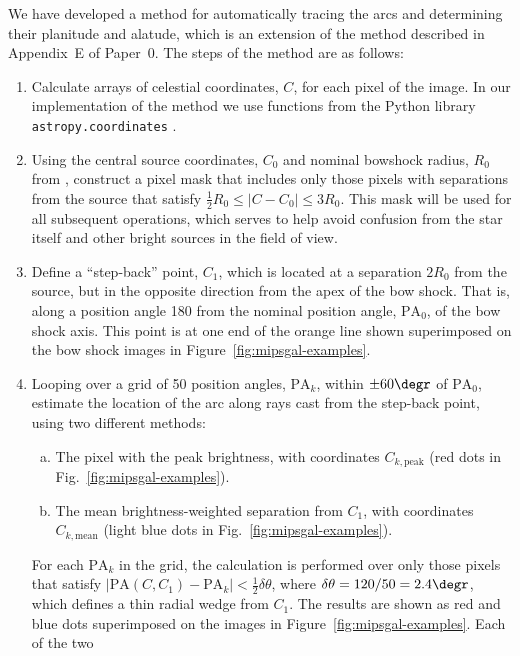 \documentclass[useAMS, usenatbib, a4paper]{mnras}
\begin{document}
We have developed a method for automatically tracing the arcs and
determining their planitude and alatude, which is an extension of the
method described in Appendix~E of Paper~0.  The steps of the method
are as follows:
\begin{enumerate}[1.]
\item Calculate arrays of celestial coordinates, \(C\), for each pixel
  of the image. In our implementation of the method we use functions
  from the Python library \texttt{astropy.coordinates}
  \citep{Astropy-Collaboration:2018a}.
\item Using the central source coordinates, \(C_0\) and nominal
  bowshock radius, \(R_0\) from \citet{Kobulnicky:2016a}, construct a
  pixel mask that includes only those pixels with separations from the
  source that satisfy \(\frac12 R_0 \le |C - C_0| \le 3 R_0\).  This mask
  will be used for all subsequent operations, which serves to help
  avoid confusion from the star itself and other bright sources in the
  field of view.
\item Define a ``step-back'' point, \(C_1\), which is located at a
  separation \(2 R_0\) from the source, but in the opposite direction
  from the apex of the bow shock. That is, along a position angle
  180\degr{} from the nominal position angle, \(\text{PA}_0\), of the
  bow shock axis.  This point is at one end of the orange line shown
  superimposed on the bow shock images in
  Figure~\ref{fig:mipsgal-examples}.
\item Looping over a grid of 50 position angles, \(\text{PA}_k\),
  within \(\pm 60\degr\) of \(\text{PA}_0\), estimate the location of
  the arc along rays cast from the step-back point, using two
  different methods:
  \begin{enumerate}[(a)]
  \item The pixel with the peak brightness, with coordinates
    \(C_{k,\text{peak}}\) (red dots in
    Fig.~\ref{fig:mipsgal-examples}).
  \item The mean brightness-weighted separation from \(C_1\), with
    coordinates \(C_{k,\text{mean}}\) (light blue dots in
    Fig.~\ref{fig:mipsgal-examples}).
  \end{enumerate}
  For each \(\text{PA}_k\) in the grid, the calculation is performed
  over only those pixels that satisfy
  \(|\text{PA}(C, C_1) - \text{PA}_k| < \frac12 \delta\theta\), where
  \(\delta\theta = 120/50 = 2.4\degr\), which defines a thin radial wedge from
  \(C_1\).  The results are shown as red and blue dots superimposed on
  the images in Figure~\ref{fig:mipsgal-examples}. Each of the two

\end{enumerate}
\end{document}
